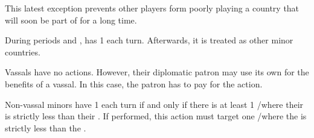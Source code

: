 \begin{designnote}
  This latest exception prevents other players form poorly playing a country
  that will soon be part of \HIS for a long time.
\end{designnote}


\aparag[Venice]
\bparag During periods  and , \paysVenise has 1 \TFI each
turn.
\bparag Afterwards, it is treated as other minor countries.

\aparag[Vassals]
\bparag Vassals have no actions. However, their diplomatic patron may use its
own \TFI for the benefits of a vassal.
\bparag In this case, the patron has to pay for the action.

\bparag Non-vassal minors have 1 \TFI each turn if and only if there is at
least 1 \CTZ/\STZ where their  is strictly less than
their .
\bparag If performed, this action must target one \CTZ/\STZ where the
 is strictly less than the .


